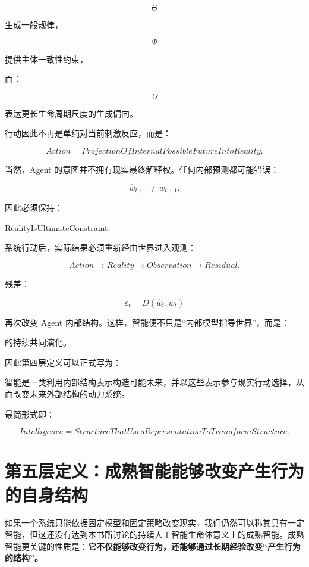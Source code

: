 \[
\Theta
\]

生成一般规律，

\[
\Psi
\]

提供主体一致性约束，

而：

\[
\Omega
\]

表达更长生命周期尺度的生成偏向。

行动因此不再是单纯对当前刺激反应，而是：

\[
\boxed{
Action
=
ProjectionOfInternalPossibleFutureIntoReality.
}
\]

当然，Agent 的意图并不拥有现实最终解释权。任何内部预测都可能错误：

\[
\hat w_{t+1}
\neq
w_{t+1}.
\]

因此必须保持：

\begin{statementbox}
RealityIsUltimateConstraint.
\end{statementbox}

系统行动后，实际结果必须重新经由世界进入观测：

\[
Action
\rightarrow
Reality
\rightarrow
Observation
\rightarrow
Residual.
\]

残差：

\[
\varepsilon_t
=
D(
\hat w_t,
w_t
)
\]

再次改变 Agent 内部结构。这样，智能便不只是“内部模型指导世界”，而是：

\begin{statementbox}
\centering
{}
\end{statementbox}

的持续共同演化。

因此第四层定义可以正式写为：

\begin{definition*}
智能是一类利用内部结构表示构造可能未来，并以这些表示参与现实行动选择，从而改变未来外部结构的动力系统。
\end{definition*}

最简形式即：

\[
\boxed{
Intelligence
=
StructureThatUsesRepresentation
ToTransformStructure.
}
\]

\section{第五层定义：成熟智能能够改变产生行为的自身结构}

如果一个系统只能依据固定模型和固定策略改变现实，我们仍然可以称其具有一定智能，但这还没有达到本书所讨论的持续人工智能生命体意义上的成熟智能。成熟智能更关键的性质是：\textbf{它不仅能够改变行为，还能够通过长期经验改变“产生行为的结构”。}

